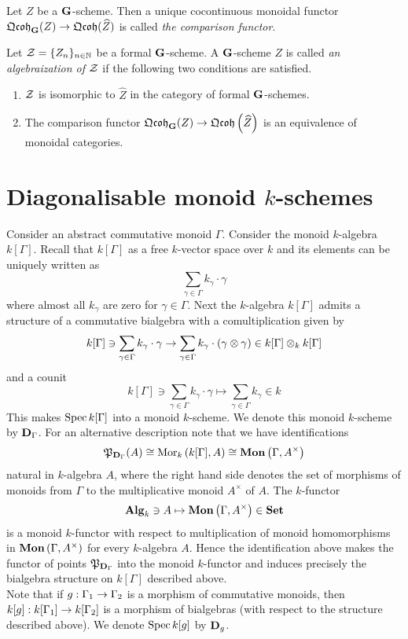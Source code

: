 \begin{definition}
Let $Z$ be a $\mathbf{G}$-scheme. Then a unique cocontinuous monoidal functor $\mathfrak{Qcoh}_{\mathbf{G}}(Z)\rightarrow \mathfrak{Qcoh}(\widehat{Z})$ is called \textit{the comparison functor}.
\end{definition}

\begin{definition}
Let ${\mathcal Z} = \{Z_n\}_{n\in \mathbb{N}}$ be a formal $\mathbf{G}$-scheme. A $\mathbf{G}$-scheme $Z$ is called \textit{an algebraization of ${\mathcal Z}$} if the following two conditions are satisfied.
\begin{enumerate}[label=\textbf{(\arabic*)}, leftmargin=1.5em]
\item ${\mathcal Z}$ is isomorphic to $\widehat{Z}$ in the category of formal $\mathbf{G}$-schemes.
\item The comparison functor $\mathfrak{Qcoh}_{\mathbf{G}}(Z)\rightarrow \mathfrak{Qcoh}\left(\widehat{Z}\right)$ is an equivalence of monoidal categories.
\end{enumerate}
\end{definition}

\section{Diagonalisable monoid $k$-schemes}
\noindent
Consider an abstract commutative monoid $\Gamma$. Consider the monoid $k$-algebra $k[\Gamma]$. Recall that $k[\Gamma]$ as a free $k$-vector space over $k$ and its elements can be uniquely written as
$$\sum_{\gamma\in \Gamma}k_{\gamma}\cdot \gamma$$
where almost all $k_{\gamma}$ are zero for $\gamma \in \Gamma$. Next the $k$-algebra $k[\Gamma]$ admits a structure of a commutative bialgebra with a comultiplication given by
$$k[\Gamma] \ni \sum_{\gamma\in \Gamma} k_{\gamma}\cdot \gamma \rightarrow \sum_{\gamma\in \Gamma}k_{\gamma}\cdot \left(\gamma\otimes \gamma\right)\in  k[\Gamma]\otimes_kk[\Gamma]$$
and a counit
$$k[\Gamma]\ni \sum_{\gamma \in \Gamma}k_{\gamma}\cdot \gamma \mapsto \sum_{\gamma\in \Gamma}k_{\gamma}\in k$$
This makes $\mathrm{Spec}\, k[\Gamma]$ into a monoid $k$-scheme. We denote this monoid $k$-scheme by $\mathbf{D}_{\Gamma}$. For an alternative description note that we have identifications
$${\mathfrak P}_{\mathbf{D}_{\Gamma}}(A) \cong \mathrm{Mor}_k\left(k[\Gamma],A\right) \cong \mathbf{Mon}\left(\Gamma,A^{\times}\right)$$
natural in $k$-algebra $A$, where the right hand side denotes the set of morphisms of monoids from $\Gamma$ to the multiplicative monoid $A^{\times}$ of $A$. The $k$-functor
$$\mathbf{Alg}_k\ni A\mapsto \mathbf{Mon}\left(\Gamma,A^{\times}\right)\in \mathbf{Set}$$
is a monoid $k$-functor with respect to multiplication of monoid homomorphisms in $\mathbf{Mon}\left(\Gamma,A^{\times}\right)$ for every $k$-algebra $A$. Hence the identification above makes the functor of points ${\mathfrak P}_{\mathbf{D}_{\Gamma}}$ into the monoid $k$-functor and induces precisely the bialgebra structure on $k[\Gamma]$ described above.\\
Note that if $g:\Gamma_1\rightarrow \Gamma_2$ is a morphism of commutative monoids, then $k[g]:k[\Gamma_1]\rightarrow k[\Gamma_2]$ is a morphism of bialgebras (with respect to the structure described above). We denote $\mathrm{Spec}\, k[g]$ by $\mathbf{D}_{g}$.

